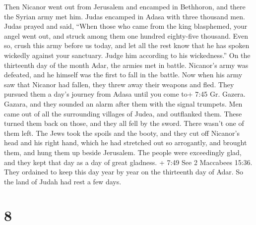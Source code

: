  Then Nicanor went out from Jerusalem and encamped in
Bethhoron, and there the Syrian army met him.  Judas
encamped in Adasa with three thousand men. Judas prayed and said,
 ``When those who came from the king blasphemed, your angel
went out, and struck among them one hundred eighty-five thousand.
 Even so, crush this army before us today, and let all the
rest know that he has spoken wickedly against your sanctuary. Judge him
according to his wickedness.''  On the thirteenth day of
the month Adar, the armies met in battle. Nicanor's army was defeated,
and he himself was the first to fall in the battle.  Now
when his army saw that Nicanor had fallen, they threw away their weapons
and fled.  They pursued them a day's journey from Adasa
until you come to+ 7:45 Gr. Gazera. Gazara, and they sounded an alarm
after them with the signal trumpets.  Men came out of all
the surrounding villages of Judea, and outflanked them. These turned
them back on those, and they all fell by the sword. There wasn't one of
them left.  The Jews took the spoils and the booty, and
they cut off Nicanor's head and his right hand, which he had stretched
out so arrogantly, and brought them, and hung them up beside Jerusalem.
 The people were exceedingly glad, and they kept that day
as a day of great gladness.  + 7:49 See 2 Maccabees 15:36.
They ordained to keep this day year by year on the thirteenth day of
Adar.  So the land of Judah had rest a few days.

\hypertarget{section-7}{%
\section{8}\label{section-7}}

